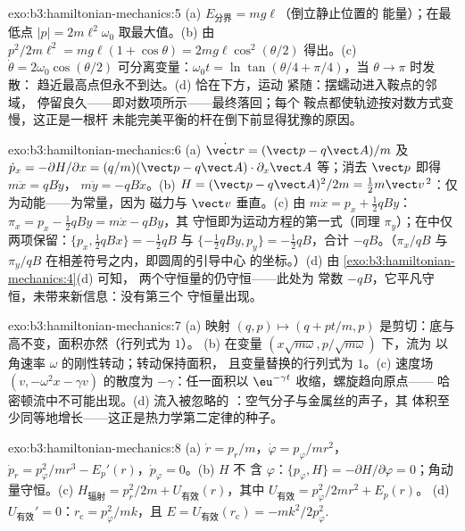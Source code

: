 \begin{solution}{exo:b3:hamiltonian-mechanics:5}
(a) $E_{\text{分界}} = mg\ell$（倒立静止位置的
能量）；在最低点 $|p| = 2m\ell^2\omega_0$ 取最大值。(b) 由
$p^2/2m\ell^2 = mg\ell(1 + \cos\theta) = 2mg\ell\cos^2(\theta/2)$ 得出。(c)
$\dot\theta = 2\omega_0\cos(\theta/2)$ 可分离变量：$\omega_0t =
\ln\tan(\theta/4 + \pi/4)$，当 $\theta \to \pi$ 时发散：
趋近最高点但永不到达。(d) 恰在下方，运动
紧随：摆蠕动进入鞍点的邻域，
停留良久——即对数项所示——最终落回；每个
鞍点都使轨迹按对数方式变慢，这正是一根杆
未能完美平衡的杆在倒下前显得犹豫的原因。
\end{solution}

\begin{solution}{exo:b3:hamiltonian-mechanics:6}
(a) $\dot{\vect r} = (\vect p - q\vect A)/m$ 及 $\dot p_x =
-\partial H/\partial x = (q/m)(\vect p - q\vect A)\cdot\partial_x\vect
A$ 等；消去 $\vect p$ 即得 $m\ddot x = qB\dot y$，
$m\ddot y = -qB\dot x$。(b) $H = (\vect p - q\vect A)^2/2m = \tfrac12
m\vect v^{\,2}$：仅为动能——为常量，因为
磁力与 $\vect v$ 垂直。(c) 由 $m\dot x = p_x +
\tfrac12 qBy$：$\pi_x = p_x - \tfrac12 qBy = m\dot x - qBy$，其
守恒即为运动方程的第一式（同理 $\pi_y$）；在中仅两项保留：$\{p_x, \tfrac12 qBx\} = -\tfrac12
qB$ 与 $\{-\tfrac12 qBy, p_y\} = -\tfrac12 qB$，合计 $-qB$。（$\pi_x/qB$ 与 $\pi_y/qB$
在相差符号之内，即圆周的引导中心
的坐标。）(d) 由 \cref{exo:b3:hamiltonian-mechanics:4}(d) 可知，
两个守恒量的仍守恒——此处为
常数 $-qB$，它平凡守恒，未带来新信息：没有第三个
守恒量出现。
\end{solution}

\begin{solution}{exo:b3:hamiltonian-mechanics:7}
(a) 映射 $(q, p) \mapsto (q + pt/m, p)$ 是剪切：底与
高不变，面积亦然（行列式为 $1$）。
(b) 在变量 $(x\sqrt{m\omega}, p/\sqrt{m\omega})$ 下，流为
以角速率 $\omega$ 的刚性转动；转动保持面积，
且变量替换的行列式为 $1$。(c) 速度场
$(v, -\omega^2x - \gamma v)$ 的散度为 $-\gamma$：任一面积以
$\eu^{-\gamma t}$ 收缩，螺旋趋向原点——
哈密顿流中不可能出现。(d) 流入被忽略的
：空气分子与金属丝的声子，其
体积至少同等地增长——这正是热力学第二定律的种子。
\end{solution}

\begin{solution}{exo:b3:hamiltonian-mechanics:8}
(a) $\dot r = p_r/m$，$\dot\varphi = p_\varphi/mr^2$，$\dot p_r =
p_\varphi^2/mr^3 - E_p'(r)$，$\dot p_\varphi = 0$。(b) $H$ 不
含 $\varphi$：$\{p_\varphi, H\} = -\partial H/\partial\varphi =
0$；角动量守恒。(c) $H_{\text{辐射}} = p_r^2/2m +
U_{\text{有效}}(r)$，其中 $U_{\text{有效}} = p_\varphi^2/2mr^2 + E_p(r)$。
(d) $U_{\text{有效}}' = 0$：$r_{\text{c}} = p_\varphi^2/mk$，且 $E =
U_{\text{有效}}(r_{\text{c}}) = -mk^2/2p_\varphi^2$.
\end{solution}

